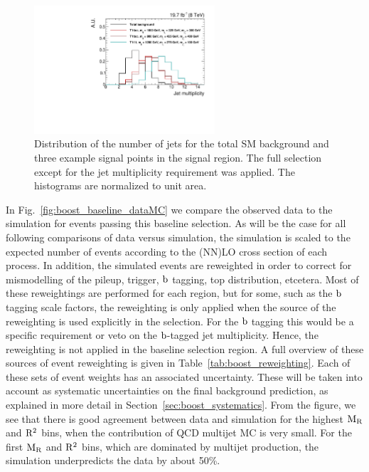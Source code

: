 \begin{figure}[htbp]
 \centering
 \includegraphics[width=0.6\textwidth]{figures/razor_selection/njets_signal_region}
 \caption{Distribution of the number of jets for the total SM background and three example signal
points in the signal region. The full selection except for the jet multiplicity requirement was
applied. The histograms are normalized to unit area.
 \label{fig:njets_sig_BG}}
\end{figure}

In Fig.~\ref{fig:boost_baseline_dataMC} we compare the observed data to the simulation for
events passing this baseline selection. 
As will be the case for all following comparisons of data versus simulation, the simulation is
scaled to the expected number of events according to the (NN)LO cross section of each process.
In addition, the simulated events are reweighted in order to correct for mismodelling of the
pileup, trigger, $\mathrm{b}$ tagging, top \pt distribution, etcetera. Most of these reweightings are
performed for each region, but for some, such as the $\mathrm{b}$ tagging scale factors, the reweighting
is only applied when the source of the reweighting is used explicitly in the selection. For the
$\mathrm{b}$ tagging this would be a specific requirement or veto on the $\mathrm{b}$-tagged jet
multiplicity. Hence, the reweighting is not applied in the baseline selection region. 
A full overview of these sources of event reweighting is given in
Table~\ref{tab:boost_reweighting}. Each of these sets of event weights has an associated
uncertainty. These will be taken into account as systematic uncertainties on the final background
prediction, as explained in more detail in Section~\ref{sec:boost_systematics}. 
From the figure, we see that there is good agreement between data and simulation for the highest
$\mathrm{M_R}$ and $\mathrm{R^2}$ bins, \ie when the contribution of QCD multijet MC is very small. 
For the first $\mathrm{M_R}$ and $\mathrm{R^2}$ bins, which are dominated by multijet production, the simulation
underpredicts the data by about 50\%. 

